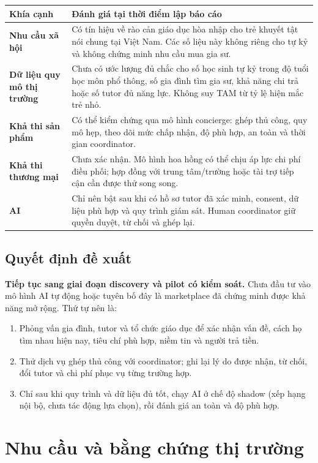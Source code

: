 \documentclass[11pt,a4paper]{article}
\begin{document}
\begin{tabularx}{\textwidth}{>{\bfseries\color{ink}}p{3.25cm}Y}
\toprule
Khía cạnh & Đánh giá tại thời điểm lập báo cáo \\
\midrule
Nhu cầu xã hội & Có tín hiệu về rào cản giáo dục hòa nhập cho trẻ khuyết tật nói
chung tại Việt Nam. Các số liệu này không riêng cho tự kỷ và không chứng minh
nhu cầu mua gia sư. \\
Dữ liệu quy mô thị trường & Chưa có ước lượng đủ chắc cho số học sinh tự kỷ trong
độ tuổi học môn phổ thông, số gia đình tìm gia sư, khả năng chi trả hoặc số tutor
đủ năng lực. Không suy TAM từ tỷ lệ hiện mắc trẻ nhỏ. \\
Khả thi sản phẩm & Có thể kiểm chứng qua mô hình concierge: ghép thủ công, quy
mô hẹp, theo dõi mức chấp nhận, độ phù hợp, an toàn và thời gian coordinator. \\
Khả thi thương mại & Chưa xác nhận. Mô hình hoa hồng có thể chịu áp lực chi phí
điều phối; hợp đồng với trung tâm/trường hoặc tài trợ tiếp cận cần được thử song
song. \\
AI & Chỉ nên bật sau khi có hồ sơ tutor đã xác minh, consent, dữ liệu phù hợp và
quy trình giám sát. Human coordinator giữ quyền duyệt, từ chối và ghép lại. \\
\bottomrule
\end{tabularx}

\subsection{Quyết định đề xuất}

\textbf{Tiếp tục sang giai đoạn discovery và pilot có kiểm soát.} Chưa đầu tư
vào mô hình AI tự động hoặc tuyên bố đây là marketplace đã chứng minh được khả
năng mở rộng. Thứ tự nên là:
\begin{enumerate}
  \item Phỏng vấn gia đình, tutor và tổ chức giáo dục để xác nhận vấn đề, cách
  họ tìm nhau hiện nay, tiêu chí phù hợp, niềm tin và người trả tiền.
  \item Thử dịch vụ ghép thủ công với coordinator; ghi lại lý do được nhận,
  từ chối, đổi tutor và chi phí phục vụ từng trường hợp.
  \item Chỉ sau khi quy trình và dữ liệu đủ tốt, chạy AI ở chế độ shadow
  (xếp hạng nội bộ, chưa tác động lựa chọn), rồi đánh giá an toàn và độ phù hợp.
\end{enumerate}

\section{Nhu cầu và bằng chứng thị trường}
\end{document}
